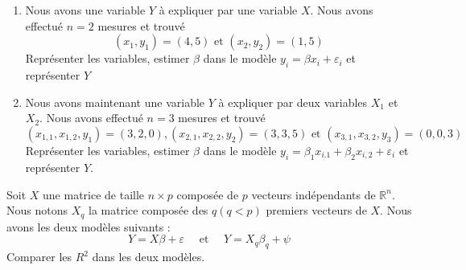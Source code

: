 \documentclass{td_um}
\providecommand{\1}{\mathds{1}}
\begin{document}
\exo{}
\begin{enumerate}
    \item Nous avons une variable $Y$ à expliquer par une variable $X$. Nous avons effectué $n=2$ mesures et trouvé
        $$
        \left(x_{1}, y_{1}\right)=(4,5) \text { et }\left(x_{2}, y_{2}\right)=(1,5)
        $$
        Représenter les variables, estimer $\beta$ dans le modèle $y_{i}=\beta x_{i}+\varepsilon_{i}$ et représenter $\hat{Y}$
    \item Nous avons maintenant une variable $Y$ à expliquer par deux variables $X_{1}$ et $X_{2}$. Nous avons effectué $n=3$ mesures et trouvé
        $$
        \left(x_{1,1}, x_{1,2}, y_{1}\right)=(3,2,0),\left(x_{2,1}, x_{2,2}, y_{2}\right)=(3,3,5) \text { et }\left(x_{3,1}, x_{3,2}, y_{3}\right)=(0,0,3)
        $$
        Représenter les variables, estimer $\beta$ dans le modèle $y_{i}=\beta_{1} x_{i .1}+\beta_{2} x_{i, 2}+\varepsilon_{i}$ et représenter $\hat{Y}$.
\end{enumerate}

\cor{\newpage}

\exo{} Soit $X$ une matrice de taille $n \times p$ composée de $p$ vecteurs indépendants de $\mathbb{R}^{n}$. Nous notons $X_{q}$ la matrice composée des $q(q<p)$ premiers vecteurs de $X$. Nous avons les deux modèles suivants :
$$
Y=X \beta+\varepsilon \quad \text { et } \quad Y=X_{q} \beta_{q}+\psi
$$
Comparer les $R^{2}$ dans les deux modèles.

\cor{\newpage}
\end{document}
